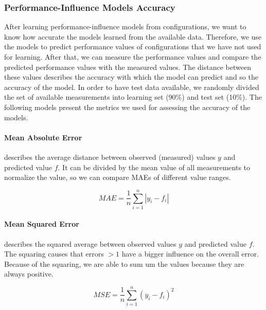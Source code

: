\subsubsection{Performance-Influence Models Accuracy}
After learning performance-influence models from configurations, we want to know how accurate the models learned from the available data. Therefore, we use the models to predict performance values of configurations that we have not used for learning. After that, we can measure the performance values and compare the predicted performance values with the measured values. The distance between these values describes the accuracy with which the model can predict and so the accuracy of the model. In order to have test data available, we randomly divided the set of available measurements into learning set (90\%) and test set (10\%). The following models present the metrics we used for assessing the accuracy of the models. 

\paragraph{Mean Absolute Error} 
describes the average distance between observed (measured) values $y$ and predicted value $f$. It can be divided by the mean value of all measurements to normalize the value, so we can compare MAEs of different value ranges.

\begin{equation}
    \label{def:mea}
    MAE=\frac{1}{n}\sum_{i=1}^n|y_i-f_i|
\end{equation}

\paragraph{Mean Squared Error} 
describes the squared average between observed values $y$ and predicted value $f$. The squaring causes that errors $>1$ have a bigger influence on the overall error. Because of the squaring, we are able to sum um the values because they are always positive.

\begin{equation}
    \label{def:mse}
    MSE=\frac{1}{n}\sum_{i=1}^n(y_i-f_i)^2
\end{equation}

